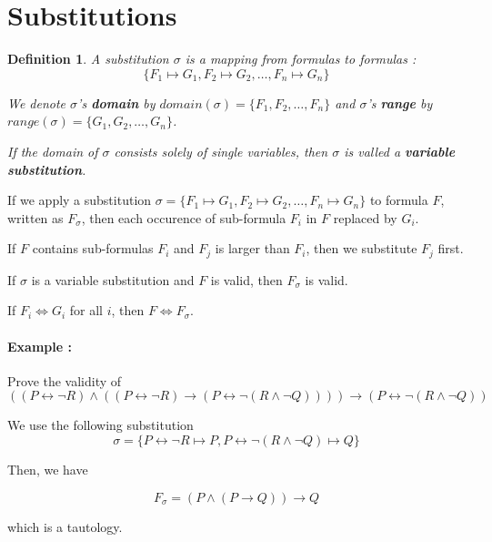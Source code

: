 \documentclass[a4paper,11pt]{report}
\newtheorem*{mydef}{Definition}
\begin{document}
\section{Substitutions}

\begin{mydef}
  A substitution $\sigma$ is a mapping from formulas to formulas :
  $$ \{ F_1 \mapsto G_1, F_2 \mapsto G_2, \dots , F_n \mapsto G_n\} $$

  We denote $\sigma$'s \textbf{domain} by $domain(\sigma) =
  \{F_1,F_2,\dots,F_n\}$ and $\sigma$'s \textbf{range} by $range(\sigma) =
  \{G_1,G_2,\dots,G_n\}$.

  If the domain of $\sigma$ consists solely of single variables, then $\sigma$
  is valled a \textbf{variable substitution}.
\end{mydef}

If we apply a substitution $\sigma = \{ F_1 \mapsto G_1, F_2 \mapsto G_2, \dots
, F_n \mapsto G_n\}$ to formula $F$, written as $F_\sigma$, then each occurence
of sub-formula $F_i$ in $F$ replaced by $G_i$.

If $F$ contains sub-formulas $F_i$ and $F_j$ is larger than $F_i$, then we
substitute $F_j$ first.

If $\sigma$ is a variable substitution and $F$ is valid, then $F_\sigma$ is
valid.

If $F_i \Leftrightarrow G_i$ for all $i$, then $F \Leftrightarrow F_\sigma$.

\paragraph{Example :} Prove the validity of
\[
  ((P \leftrightarrow \neg R) \wedge ((P \leftrightarrow \neg R) \to (P
  \leftrightarrow \neg(R \wedge \neg Q)))) \to (P \leftrightarrow \neg(R \wedge
  \neg Q))
\]

We use the following substitution
\[
  \sigma = \{ P \leftrightarrow \neg R \mapsto P, P \leftrightarrow \neg(R
  \wedge \neg Q) \mapsto Q\}
\]

Then, we have

\[
  F_\sigma = (P \wedge (P \to Q)) \to Q
\]

which is a tautology.
\end{document}

